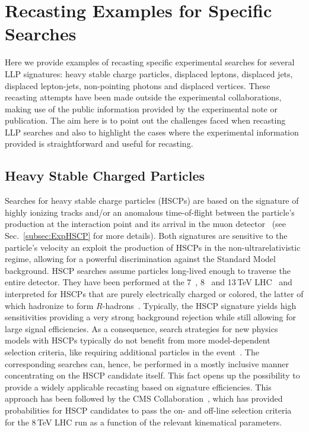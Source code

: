 \section{Recasting Examples for Specific Searches}
\label{sec:ch5-recastExamples}

Here we provide examples of recasting specific experimental
searches for several LLP signatures: heavy stable charge particles, displaced
leptons, displaced jets, displaced lepton-jets, non-pointing photons and displaced vertices.
These recasting attempts have been made outside the experimental collaborations,
making use of the public information provided by the experimental note or
publication. The aim here is to point out the challenges faced when recasting
LLP searches and also to highlight the cases where the
experimental information provided is straightforward and useful for
recasting.

\subsection{Heavy Stable Charged Particles}
\label{sec:ch5-HSCPs}

\renewcommand{\vec}[1]{\boldsymbol{#1}}
%

Searches for heavy stable charge particles (HSCPs) are based on the signature
of highly ionizing tracks
and/or an anomalous time-of-flight between the particle's production at the interaction point and its arrival in the
muon detector~\cite{Fairbairn:2006gg} (see Sec.~\ref{subsec:ExpHSCP} for more details).
Both signatures are sensitive to the particle's velocity an exploit the
production of HSCPs in the non-ultrarelativistic regime,
allowing for a powerful discrimination against the Standard Model background.
HSCP searches assume particles long-lived enough to traverse
the entire detector.
They have been performed at the 7~\cite{Chatrchyan:2012sp,Aad:2012pra},
8~\cite{Chatrchyan:2013oca,ATLAS:2014fka} and 13\,TeV
LHC~\cite{Aaboud:2016dgf,CMS:2016ybj} and interpreted for HSCPs that are
purely electrically charged or colored, the latter of which hadronize to form
$R$-hadrons~\cite{Farrar:1978xj}.
Typically, the HSCP signature yields high sensitivities providing 
a very strong background rejection while still allowing for large 
signal efficiencies. 
As a consequence, search strategies for new physics models with HSCPs
typically do not benefit from more model-dependent selection criteria, like requiring additional 
particles in the event~\cite{Heisig:2012zq}. The corresponding searches can, hence, be
performed in a mostly inclusive manner concentrating on the HSCP candidate itself.
This fact opens up the possibility to provide a widely applicable recasting based on signature
efficiencies. This approach has been followed by the CMS
Collaboration~\cite{Khachatryan:2015lla},
which has provided probabilities for HSCP candidates to pass the on- and
off-line selection criteria for the 8\,TeV LHC run as a function of the relevant kinematical parameters.


